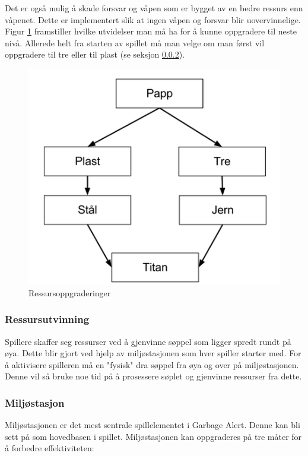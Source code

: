 Det er også mulig å skade forsvar og våpen som er bygget av en bedre ressurs enn våpenet. Dette er implementert slik at ingen våpen og forsvar blir uovervinnelige. Figur \ref{fig:ressursoppgraderinger} framstiller hvilke utvidelser man må ha for å kunne oppgradere til neste nivå. Allerede helt fra starten av spillet må man velge om man først vil oppgradere til tre eller til plast (se seksjon \ref{miljostasjon}). 

\begin{figure} [H]
	\begin{center}
	\includegraphics[scale=0.5]{images/oppgraderingstre}
	\end{center}
	\caption{Ressursoppgraderinger}
	\label{fig:ressursoppgraderinger}
\end{figure}

\subsubsection{Ressursutvinning}
Spillere skaffer seg ressurser ved å gjenvinne søppel som ligger
spredt rundt på øya. Dette blir gjort ved hjelp av miljøstasjonen
som hver spiller starter med. For å aktivisere spilleren må en "fysisk" dra søppel fra øya og over på miljøstasjonen. Denne vil så bruke noe tid på å prosessere søplet og gjenvinne ressurser fra dette.


\subsubsection{Miljøstasjon} \label{miljostasjon}
Miljøstasjonen er det mest sentrale spillelementet i Garbage
Alert. Denne kan bli sett på som hovedbasen i spillet.
Miljøstasjonen kan oppgraderes på tre måter for å forbedre effektiviteten:

